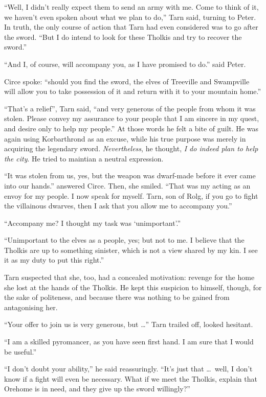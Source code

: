 ``Well, I didn't really expect them to send an army with me.  Come to think of it, we haven't even spoken about what we plan to do,'' Tarn said, turning to Peter.  In truth, the only course of action that Tarn had even considered was to go after the sword.  ``But I do intend to look for these Tholkis and try to recover the sword.''

``And I, of course, will accompany you, as I have promised to do.'' said Peter.

Circe spoke: ``should you find the sword, the elves of Treeville and Swampville will allow you to take possession of it and return with it to your mountain home.''

``That's a relief'', Tarn said, ``and very generous of the people from whom it was stolen.  Please convey my assurance to your people that I am sincere in my quest, and desire only to help my people.''  At those words he felt a bite of guilt.  He was again using Korbarthrond as an excuse, while his true purpose was merely in acquiring the legendary sword.  \emph{Nevertheless}, he thought, \emph{I do indeed plan to help the city}.  He tried to maintian a neutral expression.

``It was stolen from us, yes, but the weapon was dwarf-made before it ever came into our hands.'' answered Circe.  Then, she smiled.  ``That was my acting as an envoy for my people.  I now speak for myself.  Tarn, son of Rolg, if you go to fight the villainous dwarves, then I ask that you allow me to accompany you.''

``Accompany me?  I thought my task was `unimportant'.''

``Unimportant to the elves as a people, yes; but not to me.  I believe that the Tholkis are up to something sinister, which is not a view shared by my kin.  I see it as my duty to put this right.''

Tarn suspected that she, too, had a concealed motivation: revenge for the home she lost at the hands of the Tholkis.  He kept this suspicion to himself, though, for the sake of politeness, and because there was nothing to be gained from antagonising her.

``Your offer to join us is very generous, but \ldots'' Tarn trailed off, looked hesitant.

``I am a skilled pyromancer, as you have seen first hand.  I am sure that I would be useful.''

``I don't doubt your ability,'' he said reassuringly.  ``It's just that \ldots\ well, I don't know if a fight will even be necessary.  What if we meet the Tholkis, explain that Orehome is in need, and they give up the sword willingly?''

